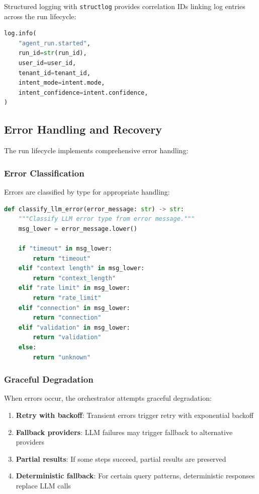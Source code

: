Structured logging with \texttt{structlog} provides correlation IDs linking log entries across the run lifecycle:

\begin{lstlisting}[language=Python, caption={Structured logging example}, label=lst:structured-log]
log.info(
    "agent_run.started",
    run_id=str(run_id),
    user_id=user_id,
    tenant_id=tenant_id,
    intent_mode=intent.mode,
    intent_confidence=intent.confidence,
)
\end{lstlisting}

\subsection{Error Handling and Recovery}

The run lifecycle implements comprehensive error handling:

\subsubsection{Error Classification}

Errors are classified by type for appropriate handling:

\begin{lstlisting}[language=Python, caption={LLM error classification}, label=lst:error-classification]
def classify_llm_error(error_message: str) -> str:
    """Classify LLM error type from error message."""
    msg_lower = error_message.lower()
    
    if "timeout" in msg_lower:
        return "timeout"
    elif "context length" in msg_lower:
        return "context_length"
    elif "rate limit" in msg_lower:
        return "rate_limit"
    elif "connection" in msg_lower:
        return "connection"
    elif "validation" in msg_lower:
        return "validation"
    else:
        return "unknown"
\end{lstlisting}

\subsubsection{Graceful Degradation}

When errors occur, the orchestrator attempts graceful degradation:

\begin{enumerate}
    \item \textbf{Retry with backoff}: Transient errors trigger retry with exponential backoff
    \item \textbf{Fallback providers}: LLM failures may trigger fallback to alternative providers
    \item \textbf{Partial results}: If some steps succeed, partial results are preserved
    \item \textbf{Deterministic fallback}: For certain query patterns, deterministic responses replace LLM calls
\end{enumerate}

